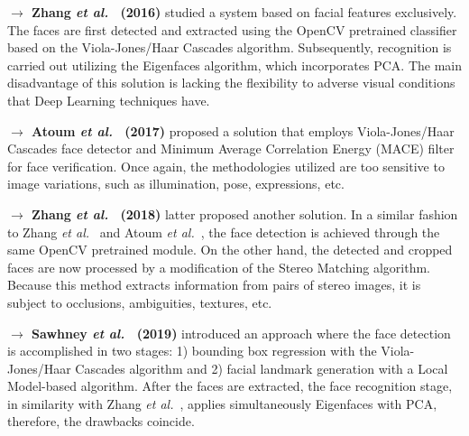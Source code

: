 \documentclass[class=report, crop=false, a4paper, 12pt]{standalone}
\begin{document}
\vspace{0.7\baselineskip}
\noindent\textbf{$\rightarrow$ Zhang \textit{et al.}~\autocite{zhangVirtualLaboratorySystem2016} (2016)} studied a system based on facial features exclusively. The faces are first detected and extracted using the OpenCV pretrained classifier based on the Viola-Jones/Haar Cascades algorithm. Subsequently, recognition is carried out utilizing the Eigenfaces algorithm, which incorporates \gls{PCA}. The main disadvantage of this solution is lacking the flexibility to adverse visual conditions that Deep Learning techniques have.

\vspace{0.7\baselineskip}
\noindent\textbf{$\rightarrow$ Atoum \textit{et al.}~\autocite{atoumAutomatedOnlineExam2017} (2017)} proposed a solution that employs Viola-Jones/Haar Cascades face detector and Minimum Average Correlation Energy (MACE) filter for face verification. Once again, the methodologies utilized are too sensitive to image variations, such as illumination, pose, expressions, etc.

\vspace{0.7\baselineskip}
\noindent\textbf{$\rightarrow$ Zhang \textit{et al.}~\autocite{zhangVirtualProctorBiometric2018} (2018)} latter proposed another solution. In a similar fashion to Zhang \textit{et al.}~\autocite{zhangVirtualLaboratorySystem2016} and Atoum \textit{et al.}~\autocite{atoumAutomatedOnlineExam2017}, the face detection is achieved through the same OpenCV pretrained module. On the other hand, the detected and cropped faces are now processed by a modification of the Stereo Matching algorithm. Because this method extracts information from pairs of stereo images, it is subject to occlusions, ambiguities, textures, etc.

\vspace{0.7\baselineskip}
\noindent\textbf{$\rightarrow$ Sawhney \textit{et al.}~\autocite{sawhneyRealTimeSmartAttendance2019} (2019)} introduced an approach where the face detection is accomplished in two stages: 1) bounding box regression with the Viola-Jones/Haar Cascades algorithm and 2) facial landmark generation with a Local Model-based algorithm. After the faces are extracted, the face recognition stage, in similarity with Zhang \textit{et al.}~\autocite{zhangVirtualLaboratorySystem2016}, applies simultaneously Eigenfaces with PCA, therefore, the drawbacks coincide.
\end{document}

